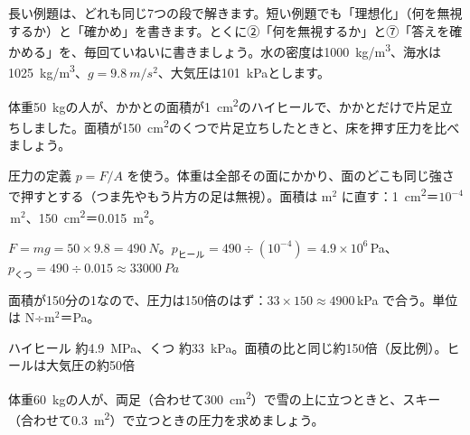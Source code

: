 
\noindent 長い例題は、どれも同じ7つの段で解きます。短い例題でも「理想化」（何を無視するか）と「確かめ」を書きます。とくに②「何を無視するか」と⑦「答えを確かめる」を、毎回ていねいに書きましょう。水の密度は\qty{1000}{kg/m^3}、海水は\qty{1025}{kg/m^3}、$g=\qty{9.8}{m/s^2}$、大気圧は\qty{101}{kPa}とします。

\begin{reidai}[ハイヒールとくつ]
\label{ph:力-12:ex1}体重\qty{50}{kg}の人が、かかとの面積が\qty{1}{cm^2}のハイヒールで、かかとだけで片足立ちしました。面積が\qty{150}{cm^2}のくつで片足立ちしたときと、床を押す圧力を比べましょう。
\par\kangaekata 圧力の定義 $p=F/A$ を使う。体重は全部その面にかかり、面のどこも同じ強さで押すとする（つま先やもう片方の足は無視）。面積は m$^2$ に直す：\qty{1}{cm^2}＝$10^{-4}$\,m$^2$、\qty{150}{cm^2}＝\qty{0.015}{m^2}。
\par\shiki $F=mg=50\times9.8=\qty{490}{N}$。$p_{\text{ヒール}}=490\div (10^{-4})=4.9\times10^6$\,Pa、$p_{\text{くつ}}=490\div 0.015\approx\qty{33000}{Pa}$
\par{} 面積が150分の1なので、圧力は150倍のはず：$33\times150\approx4900$\,kPa で合う。単位は N÷m$^2$＝Pa。
\par\kotae ハイヒール 約\qty{4.9}{MPa}、くつ 約\qty{33}{kPa}。面積の比と同じ約150倍（反比例）。ヒールは大気圧の約50倍
\end{reidai}
\begin{jibun}
体重\qty{60}{kg}の人が、両足（合わせて\qty{300}{cm^2}）で雪の上に立つときと、スキー（合わせて\qty{0.3}{m^2}）で立つときの圧力を求めましょう。
\end{jibun}

